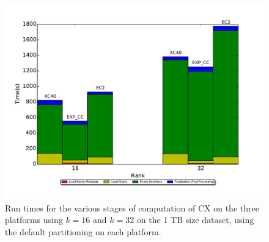     \begin{figure} [h!btp]
    \begin{centering}
      \includegraphics[scale=0.4]{images/CX_Size_Scaling_EXP_CC_xc40_ec2_Rank_16_and_32_Partitions_default.pdf}
    \end{centering}
    \caption{ Run times for the various stages of computation of CX on the three platforms using $k=16$ and $k=32$ on the 1 TB size dataset, using the default partitioning on each platform.} 
    \label{fig:h2hrank16} 
    \end{figure}

    
  

  


